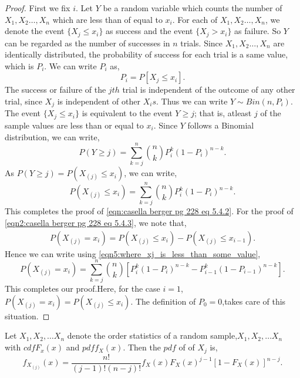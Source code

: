 \documentclass[a4paper,english,12pt]{article}
\begin{document}
\begin{proof}
First we fix $i$. Let $Y$ be a random variable which counts the number of $X_1,X_2 \ldots,X_n$ which are less than of equal to $x_i$. For each of $X_1,X_2 \ldots,X_n$, we denote the event $\{X_j \leq x_i\}$ as success and the event $\{X_j>x_i\}$ as failure. So $Y$ can be regarded as the number of successes in $n$ trials. Since $X_1,X_2 \ldots,X_n$  are identically distributed, the probability of success for each trial is a same value, which is $P_i$. We can write $P_i$ as,
\begin{equation}
P_i=P[X_j \leq x_i].
\end{equation}
The success or failure of the $jth$ trial is independent of the outcome of any other trial, since $X_j$ is independent of other $X_{i}s$. Thus we can write $Y \sim Bin(n,P_i)$. \\
The event $\{X_j \leq x_i\}$ is equivalent to the event ${Y \geq j}$; that is, atleast $j$ of the sample values are less than or equal to $x_i$. Since $Y$ follows a Binomial distribution, we can write,
\begin{equation} \label{eq4:eqn_where_Y_is_more_than_some_value}
P(Y \geq j)={\sum\limits_{k=j}^n} \binom{n}{k} P_i ^{k} (1-P_i)^{n-k}.
\end{equation}
As $P(Y \geq j)=P(X_{(j)} \leq x_i)$, we can write,
\begin{equation} \label{eqn5:where_xj_is_less_than_some_value}
P(X_{(j)} \leq x_i)={\sum\limits_{k=j}^n} \binom{n}{k} P_i ^{k} (1-P_i)^{n-k}.
\end{equation}
This completes the proof of \eqref{eqn:casella berger pg 228 eq 5.4.2}. For the proof of \eqref{eqn2:casella berger pg 228 eq 5.4.3}, we note that, 
\begin{align}
P(X_{(j)} = x_i)= P(X_{(j)} \leq x_i)-P(X_{(j)} \leq x_{i-1}). \nonumber
\end{align}
Hence we can write using \eqref{eqn5:where_xj_is_less_than_some_value},
\begin{equation}
P(X_{(j)} = x_i)={\sum\limits_{k=j}^n} \binom{n}{k} [P_i ^{k} (1-P_i)^{n-k} - P_{i-1} ^{k} (1-P_{i-1})^{n-k}].
\end{equation}
This completes our proof.Here, for the case $i=1$, $P(X_{(j)} = x_i)=P(X_{(j)} \leq x_i)$. The definition of $P_0=0$,takes care of this situation.
\end{proof}
\begin{thm}
Let $X_{1},X_{2}, \dots X_{n}$ denote the order statistics of a random sample,$X_1,X_2, \dots X_n$ with $cdf F_x (x)$ and $pdf f_X (x)$. Then the $pdf$ of of $X_j$ is,
\begin{equation}
f_{X_{(j)}} (x)= \frac{n!}{(j-1)!(n-j)!} f_X (x) F_X (x) ^{j-1} [1 - F_X (x)]^{n-j}.
\end{equation}
\end{thm}
\end{document}
